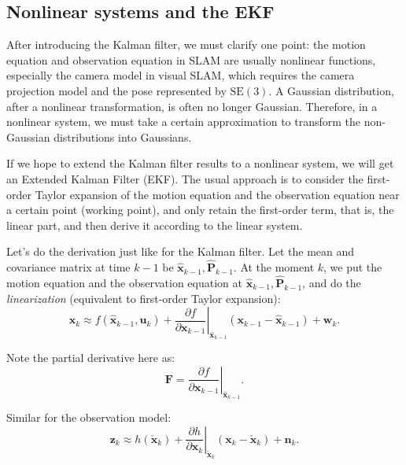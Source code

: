 \subsection{Nonlinear systems and the EKF}
After introducing the Kalman filter, we must clarify one point: the motion equation and observation equation in SLAM are usually nonlinear functions, especially the camera model in visual SLAM, which requires the camera projection model and the pose represented by $\mathrm{SE}(3)$.  A Gaussian distribution, after a nonlinear transformation, is often no longer Gaussian. Therefore, in a nonlinear system, we must take a certain approximation to transform the non-Gaussian distributions into Gaussians. 

If we hope to extend the Kalman filter results to a nonlinear system, we will get an Extended Kalman Filter (EKF). The usual approach is to consider the first-order Taylor expansion of the motion equation and the observation equation near a certain point (working point), and only retain the first-order term, that is, the linear part, and then derive it according to the linear system. 

Let's do the derivation just like for the Kalman filter. Let the mean and covariance matrix at time $k-1$ be $\mathbf{\hat{x}}_{k-1},\mathbf{\hat{P}}_{k-1}$. At the moment $k$, we put the motion equation and the observation equation at $\mathbf{\hat{x}}_{k-1},\mathbf{\hat{P}}_{k-1}$, and do the \textit{linearization} (equivalent to first-order Taylor expansion):
\begin{equation}
	{\mathbf{x}_k} \approx f\left( {{{\mathbf{\hat x}}_{k - 1}},{\mathbf{u}_k}} \right) + {\left. {\frac{{\partial f}}{{\partial {\mathbf{x}_{k - 1}}}}} \right|_{{{\mathbf{\hat x}}_{k - 1}}}}\left( {{\mathbf{x}_{k - 1}} - {{\mathbf{\hat x}}_{k - 1}}} \right) + {\mathbf{w}_k}.
\end{equation}

Note the partial derivative here as:
\begin{equation}
	\mathbf{F} = \left. {\frac{{\partial f}}{{\partial {\mathbf{x}_{k - 1}}}}} \right|_{{{\mathbf{\hat x}}_{k - 1}}}.
\end{equation}

Similar for the observation model:
\begin{equation}
	{\mathbf{z}_k} \approx h\left( {{{\mathbf{\check x}}_k}} \right) + {\left. {\frac{{\partial h}}{{\partial {\mathbf{x}_k}}}} \right|_{{{\mathbf{\check x}}_k}}}\left( {\mathbf{x}_k - {{\mathbf{\check x}}_k}} \right) + {\mathbf{n}_k}.
\end{equation}

